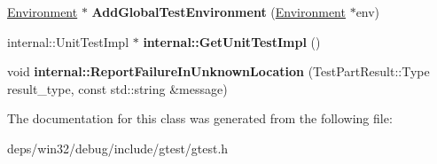 \begin{DoxyCompactItemize}
\item 
\hypertarget{classtesting_1_1_unit_test_a5ec26e4c31220ff8e769cc09689a4d6d}{}\hyperlink{classtesting_1_1_environment}{Environment} $\ast$ {\bfseries Add\+Global\+Test\+Environment} (\hyperlink{classtesting_1_1_environment}{Environment} $\ast$env)\label{classtesting_1_1_unit_test_a5ec26e4c31220ff8e769cc09689a4d6d}

\item 
\hypertarget{classtesting_1_1_unit_test_a56e56be7066957d612e53b5c60f6ac08}{}internal\+::\+Unit\+Test\+Impl $\ast$ {\bfseries internal\+::\+Get\+Unit\+Test\+Impl} ()\label{classtesting_1_1_unit_test_a56e56be7066957d612e53b5c60f6ac08}

\item 
\hypertarget{classtesting_1_1_unit_test_a73f5a158c13793b90c80d854c9a75120}{}void {\bfseries internal\+::\+Report\+Failure\+In\+Unknown\+Location} (Test\+Part\+Result\+::\+Type result\+\_\+type, const std\+::string \&message)\label{classtesting_1_1_unit_test_a73f5a158c13793b90c80d854c9a75120}

\end{DoxyCompactItemize}


The documentation for this class was generated from the following file\+:\begin{DoxyCompactItemize}
\item 
deps/win32/debug/include/gtest/gtest.\+h\end{DoxyCompactItemize}
